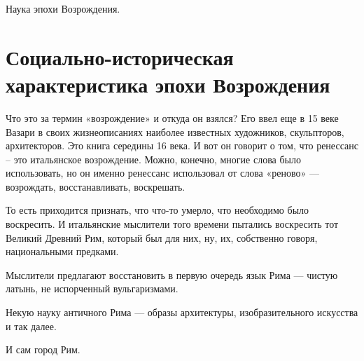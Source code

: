 Наука эпохи Возрождения. 

\section{Социально-историческая характеристика эпохи Возрождения}

Что это за термин «возрождение» и откуда он взялся? Его ввел еще в
15 веке Вазари в своих жизнеописаниях наиболее известных художников,
скульпторов, архитекторов. Это книга середины 16 века. И вот он говорит о том,
что ренессанс – это итальянское возрождение. Можно, конечно, многие слова было
использовать, но он именно ренессанс использовал от слова «реново» — возрождать, восстанавливать, воскрешать. 

То есть приходится признать, что что-то умерло, что необходимо было воскресить. 
И итальянские
мыслители того времени пытались воскресить тот Великий Древний Рим, который был для
них, ну, их, собственно говоря, национальными предками. 

Мыслители предлагают восстановить
в первую очередь язык Рима — чистую латынь, не испорченный вульгаризмами. 

Некую науку античного Рима — образы архитектуры, изобразительного искусства и так далее. 

И сам город Рим.



